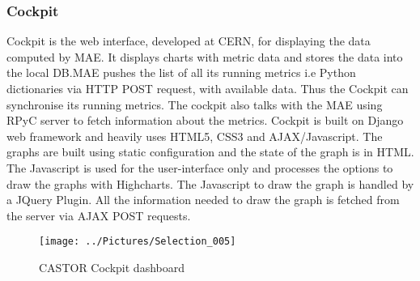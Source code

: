 \documentclass[11pt, letterpaper]{article}            %
\begin{document}
\subsubsection{Cockpit}
Cockpit is the web interface, developed at CERN, for displaying the  data computed by MAE. It displays charts with metric data and stores the data into the local DB.MAE pushes the list of all its running metrics i.e Python dictionaries via HTTP POST request, with available data. Thus the Cockpit can synchronise its running metrics. The cockpit also talks with the MAE using RPyC server to fetch information about the metrics.  Cockpit is built on Django web framework and heavily uses HTML5, CSS3 and AJAX/Javascript. The graphs are built using static configuration and the state of the graph is in HTML. The Javascript is used for the user-interface only and processes the options to draw the graphs with Highcharts.  The Javascript to draw the graph is handled by a JQuery Plugin. All the information needed to draw the graph is fetched from the server via AJAX POST requests.\citep{cockpit}
\begin{figure}[h]
	\centering
    \texttt{[image: ../Pictures/Selection\_005]}
    	\caption{CASTOR Cockpit dashboard}
\end{figure}
\end{document}
